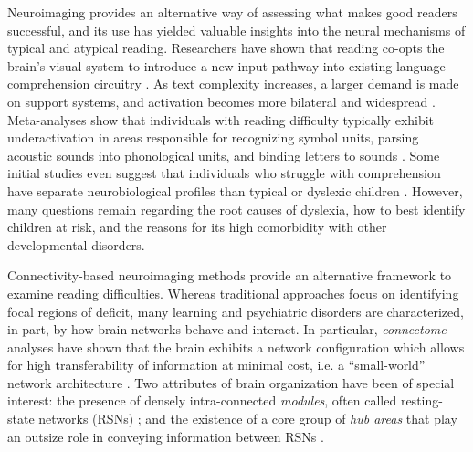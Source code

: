 Neuroimaging provides an alternative way of assessing what makes good readers successful, and its use has yielded valuable insights into the neural mechanisms of typical and atypical reading. Researchers have shown that reading co-opts the brain's visual system to introduce a new input pathway into existing language comprehension circuitry \citep{Jobard2007}. As text complexity increases, a larger demand is made on support systems, and activation becomes more bilateral and widespread \citep{Xu2005}.  Meta-analyses show that individuals with reading difficulty typically exhibit underactivation in areas responsible for recognizing symbol units, parsing acoustic sounds into phonological units, and binding letters to sounds \citep{Maisog2008, Richlan2009, Paulesu2014}. Some initial studies even suggest that individuals who struggle with comprehension have separate neurobiological profiles than typical or dyslexic children \cite{Bailey2016}. However, many questions remain regarding the root causes of dyslexia, how to best identify children at risk, and the reasons for its high comorbidity with other developmental disorders. 

Connectivity-based neuroimaging methods provide an alternative framework to examine reading difficulties. Whereas traditional approaches focus on identifying focal regions of deficit, many learning and psychiatric disorders are characterized, in part, by how brain networks behave and interact. In particular, \textit{connectome} analyses have shown that the brain exhibits a network configuration which allows for high transferability of information at minimal cost, i.e. a ``small-world'' network architecture \citep{Bullmore2012}. Two attributes of brain organization have been of special interest: the presence of densely intra-connected \textit{modules}, often called resting-state networks (RSNs) \citep{Sporns2016}; and the existence of a core group of \textit{hub areas} that play an outsize role in conveying information between RSNs \citep{VandenHeuvel2011}. 

